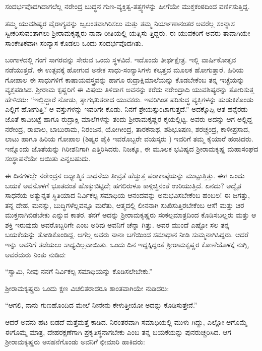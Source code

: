ಸಂದರ್ಭವೊದಗಿದಾಗಲೆಲ್ಲ ನರೇಂದ್ರ ಬುದ್ಧನ ಗುಣ-ವ್ಯಕ್ತಿತ್ವ-ತತ್ತ್ವಗಳನ್ನು ಹೀಗೆಯೇ ಮುಕ್ತಕಂಠದಿಂದ ವರ್ಣಿಸುತ್ತಿದ್ದ.

ತಮ್ಮ ಯುವಶಿಷ್ಯರ ವೈರಾಗ್ಯವನ್ನು ಜ್ವಲಂತವಾಗಿರಿಸಲು ಮತ್ತು ತಮ್ಮ ನಿರ್ಯಾಣಾನಂತರ ಅವರೆಲ್ಲ ಸಂನ್ಯಾಸ ಸ್ವೀಕರಿಸುವಂತಾಗಲು ಶ್ರೀರಾಮಕೃಷ್ಣರು ನಾನಾ ರೀತಿಯಲ್ಲಿ ಯತ್ನಿಸು ತ್ತಿದ್ದರು. ಈ ಯುವಕರಿಗೆ ಅವರು ತಾವಾಗಿಯೇ ಸಾಂಕೇತಿಕವಾಗಿ ಸಂನ್ಯಾಸ ಕೊಡಲು ಒಂದು ಸಂದರ್ಭವೊದಗಿತು.

ಬಂಗಾಳದಲ್ಲಿ ಗಂಗೆ ಸಾಗರವನ್ನು ಸೇರುವ ಒಂದು ಸ್ಥಳವಿದೆ. ಇದೊಂದು ತೀರ್ಥಕ್ಷೇತ್ರ. ಇಲ್ಲಿ ವಾರ್ಷಿಕೋತ್ಸವ ನಡೆಯುತ್ತದೆ. ಈ ಉತ್ಸವಕ್ಕೆ ಹೋಗುವ ಅನೇಕ ಸಾಧು-ಸಂನ್ಯಾಸಿಗಳು ಕಲ್ಕತ್ತದ ಮೂಲಕ ಹೋಗುತ್ತಾರೆ. ಹಿರಿಯ ಗೋಪಾಲ ಈ ಸಾಧುಗಳಿಗೆ ಕಾಷಾಯವಸ್ತ್ರವನ್ನು ಹಾಗೂ ರುದ್ರಾಕ್ಷಿಮಾಲೆಯನ್ನು ಕೊಡಬೇಕೆಂಬ ತನ್ನ ಇಚ್ಛೆಯನ್ನು ವ್ಯಕ್ತಪಡಿಸಿದ. ಶ್ರೀರಾಮ ಕೃಷ್ಣರಿಗೆ ಈ ವಿಷಯ ತಿಳಿದಾಗ ಅವನನ್ನು ಕರೆದು ನರೇಂದ್ರಾದಿ ಯುವಶಿಷ್ಯರನ್ನು ತೋರಿಸುತ್ತ ಹೇಳಿದರು: “ಇಲ್ಲಿದ್ದಾರೆ ನೋಡು, ತ್ಯಾಗಭರಿತರಾದ ಯುವಕರು. ಇವರಿಗಿಂತ ಪರಿಶುದ್ಧ ವ್ಯಕ್ತಿಗಳನ್ನು ಹುಡುಕಿಕೊಂಡು ಎಲ್ಲಿಗೆ ಹೋಗುತ್ತಿ? ಆ ವಸ್ತುಗಳನ್ನು ಇವರಿಗೇ ಕೊಡು. ನಿನಗೆ ಶ್ರೇಯಸ್ಸುಂಟಾಗುತ್ತದೆ.” ಅದಕ್ಕೊಪ್ಪಿ ಆತ ಹನ್ನೆರಡು ಜೊತೆ ಕಾವಿಬಟ್ಟೆ ಹಾಗೂ ರುದ್ರಾಕ್ಷಿ ಮಾಲೆಗಳನ್ನು ತಂದು ಶ್ರೀರಾಮಕೃಷ್ಣರ ಕೈಯಲ್ಲಿಟ್ಟ. ಅವರು ಅದನ್ನು ಆಗ ಅಲ್ಲಿದ್ದ ನರೇಂದ್ರ, ರಾಖಾಲ, ಬಾಬುರಾಮ, ನಿರಂಜನ, ಯೋಗೀಂದ್ರ, ತಾರಕನಾಥ, ಶಶಿಭೂಷಣ, ಶರಚ್ಚಂದ್ರ, ಕಾಳೀಪ್ರಸಾದ, ಲಾಟು ಹಾಗೂ ಹಿರಿಯ ಗೋಪಾಲ (ಶಿಷ್ಯರ ಪೈಕಿ ಇವರೊಬ್ಬರೇ ವಯಸ್ಕರು ) ಇವರಿಗೆ ತಮ್ಮ ಕೈಯಾರೆ ಹಂಚಿದರು. ಇನ್ನೊಂದು ಜೊತೆಯನ್ನು ಗಿರೀಶನಿಗಾಗಿ ಎತ್ತಿರಿಸಿದರು. ನಿಜಕ್ಕೂ, ಈ ಮೂಲಕ ಭವಿಷ್ಯದ ಶ್ರೀರಾಮಕೃಷ್ಣ ಮಹಾಸಂಘದ ಸಂಸ್ಥಾಪನೆಯೇ ಆಯಿತು ಎನ್ನಬಹುದು.

ಈ ದಿನಗಳಲ್ಲೇ ನರೇಂದ್ರನ ಆಧ್ಯಾತ್ಮಿಕ ಸಾಧನೆಯ ತೀವ್ರತೆ ಹೆಚ್ಚುತ್ತ ಪರಾಕಾಷ್ಠೆಯನ್ನು ಮುಟ್ಟುತ್ತಿತ್ತು. ಈಗ ಒಂದು ಬಯಕೆ ಅವನೊಳಗೆ ಭೂತದಂತೆ ಹೊಕ್ಕುಬಿಟ್ಟಿದೆ; ಹಗಲಿರುಳೂ ಕಾಳ್ಗಿಚ್ಚಿನಂತೆ ಉರಿಯುತ್ತಿದೆ. ಏನದು? ಅದ್ವೈತ ಸಾಧನೆಯ ಅತ್ಯುನ್ನತ ಸ್ಥಿತಿಯಾದ ನಿರ್ವಿಕಲ್ಪ ಸಮಾಧಿಯ ಆನಂದವನ್ನು ಅನುಭವಿಸಬೇಕೆಂಬ ಹಂಬಲ! ಈ ಜಗತ್ತು, ತನ್ನ ದೇಹ, ಮನಸ್ಸು, ಬುದ್ಧಿಗಳೆಲ್ಲವನ್ನೂ ಮರೆತು, ಆತ್ಮದಲ್ಲಿ ಲೀನನಾಗಿ ಸುಖಿಸುತ್ತಿರಬೇಕೆಂಬ ಆಸೆ! ಮತ್ತು ಚಿರ ಮುಕ್ತನಾಗಿಬಿಡಬೇಕು ಎನ್ನುವ ಕಾತರ. ತನಗೆ ಅದನ್ನು ಶ್ರೀರಾಮಕೃಷ್ಣರು ಸಂಕಲ್ಪಮಾತ್ರದಿಂದ ಕೊಡಿಸಬಲ್ಲರು ಮತ್ತು ಆ ಶಕ್ತಿ ಇರುವುದು ಅವರೊಬ್ಬರಿಗೇ ಎಂಬ ಅರಿವು ಅವನಿಗೆ ಚೆನ್ನಾ ಗಿತ್ತು. ಅವರ ಮುಂದೆ ಎಷ್ಟೋ ಸಲ ತನ್ನ ಬಯಕೆಯನ್ನು ತೋಡಿಕೊಂಡಿದ್ದ. ಆಗೆಲ್ಲ ಅವರು ನಾನಾ ಬಗೆಯಿಂದ ಸಮಾಧಾನ ನೀಡಿ ಸುಮ್ಮನಾಗಿಸಿದ್ದರು. ಆದರೆ ಇನ್ನು ಅವನಿಗೆ ತಡೆಯಲು ಸಾಧ್ಯವಿಲ್ಲವಾಯಿತು. ಒಂದು ದಿನ ಇದ್ದಕ್ಕಿದ್ದಂತೆ ಶ್ರೀರಾಮಕೃಷ್ಣರ ಕೋಣೆಯೊಳಕ್ಕೆ ನುಗ್ಗಿ, ಅವರೆದುರು ನಿಂತು ನುಡಿದ:

“ಸ್ವಾಮಿ, ನೀವು ನನಗೆ ನಿರ್ವಿಕಲ್ಪ ಸಮಾಧಿಯನ್ನು ಕೊಡಿಸಲೇಬೇಕು.”

ಶ್ರೀರಾಮಕೃಷ್ಣರು ಒಂದು ಕ್ಷಣ ವಿಚಲಿತರಾದರೂ ಶಾಂತವಾಗಿಯೇ ನುಡಿದರು:

“ಆಗಲಿ, ನಾನು ಗುಣಹೊಂದಿದ ಮೇಲೆ ನೀನೇನು ಕೇಳುತ್ತೀಯೋ ಅದನ್ನು ಕೊಡಿಸುತ್ತೇನೆ.”

ಆದರೆ ಅವನು ಹಟ ಬಿಡದೆ ಮತ್ತೆಮತ್ತೆ ಕಾಡಿದ. ನಿರಂತರವಾಗಿ ಸಮಾಧಿಯಲ್ಲಿ ಮುಳು ಗಿದ್ದು, ಎಲ್ಲೋ ಆಗೊಮ್ಮೆ ಈಗೊಮ್ಮೆ ಮಾತ್ರ, ದೇಹರಕ್ಷಣೆಗಾಗಿ ಪ್ರಕೃತಿಸ್ಥನಾಗಬೇಕು ಎಂಬ ತನ್ನ ಬಯಕೆಯನ್ನು ಪುನರುಚ್ಚರಿಸಿದ. ಆಗ ಶ್ರೀರಾಮಕೃಷ್ಣರು ಅಸಹನೆಗೊಂಡು ಅವನಿಗೆ ಛೀಮಾರಿ ಹಾಕಿದರು:

